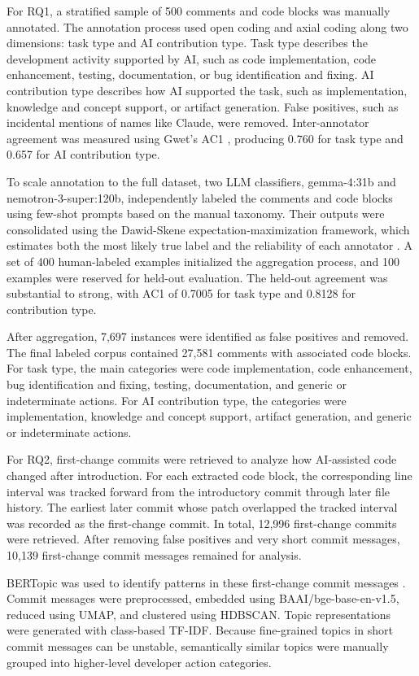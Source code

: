 \documentclass[12pt,draftclsnofoot,onecolumn]{IEEEtran}
\begin{document}
For RQ1, a stratified sample of 500 comments and code blocks was manually annotated. The annotation process used open coding and axial coding along two dimensions: task type and AI contribution type. Task type describes the development activity supported by AI, such as code implementation, code enhancement, testing, documentation, or bug identification and fixing. AI contribution type describes how AI supported the task, such as implementation, knowledge and concept support, or artifact generation. False positives, such as incidental mentions of names like Claude, were removed. Inter-annotator agreement was measured using Gwet's AC1 \cite{gwet2014handbook}, producing 0.760 for task type and 0.657 for AI contribution type.

To scale annotation to the full dataset, two LLM classifiers, gemma-4:31b and nemotron-3-super:120b, independently labeled the comments and code blocks using few-shot prompts based on the manual taxonomy. Their outputs were consolidated using the Dawid-Skene expectation-maximization framework, which estimates both the most likely true label and the reliability of each annotator \cite{dawid1979maximum}. A set of 400 human-labeled examples initialized the aggregation process, and 100 examples were reserved for held-out evaluation. The held-out agreement was substantial to strong, with AC1 of 0.7005 for task type and 0.8128 for contribution type.

After aggregation, 7,697 instances were identified as false positives and removed. The final labeled corpus contained 27,581 comments with associated code blocks. For task type, the main categories were code implementation, code enhancement, bug identification and fixing, testing, documentation, and generic or indeterminate actions. For AI contribution type, the categories were implementation, knowledge and concept support, artifact generation, and generic or indeterminate actions.

For RQ2, first-change commits were retrieved to analyze how AI-assisted code changed after introduction. For each extracted code block, the corresponding line interval was tracked forward from the introductory commit through later file history. The earliest later commit whose patch overlapped the tracked interval was recorded as the first-change commit. In total, 12,996 first-change commits were retrieved. After removing false positives and very short commit messages, 10,139 first-change commit messages remained for analysis.

BERTopic was used to identify patterns in these first-change commit messages \cite{grootendorst2022bertopic}. Commit messages were preprocessed, embedded using BAAI/bge-base-en-v1.5, reduced using UMAP, and clustered using HDBSCAN. Topic representations were generated with class-based TF-IDF. Because fine-grained topics in short commit messages can be unstable, semantically similar topics were manually grouped into higher-level developer action categories.
\end{document}
